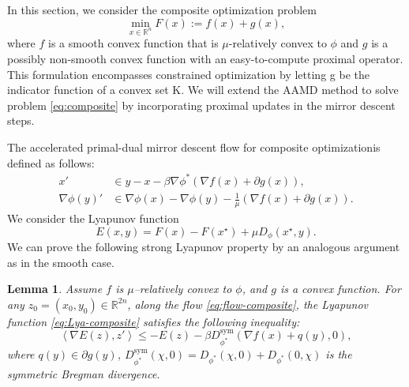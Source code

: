 \documentclass{article}
\newcommand{\LC}[1]{\textcolor{red}{#1}}
\newcommand{\dual}[1]{\left\langle {#1} \right\rangle}
\theoremstyle{plain}
\newtheorem{lemma}[theorem]{Lemma}
\theoremstyle{definition}
\theoremstyle{remark}
\begin{document}
In this section, we consider the composite optimization problem
\begin{equation}\label{eq:composite}
    \min_{x\in\mathbb{R}^n} F(x):=f(x)+g(x),
\end{equation}
where $f$ is a smooth convex function that is $\mu$-relatively convex to $\phi$ and $g$ is a possibly non-smooth convex function with an easy-to-compute proximal operator. This formulation encompasses constrained optimization by letting g be the indicator
function of a convex set K. We will extend the AAMD method to solve problem \eqref{eq:composite} by incorporating proximal updates in the mirror descent steps. 

The accelerated primal-dual mirror descent flow for composite optimizationis defined as follows:
\begin{equation}\label{eq:flow-composite}
\begin{aligned}
    x' &\in y-x-\beta\nabla\phi^*(\nabla f(x)+\partial g(x)), \\
    \nabla \phi(y)' &\in \nabla \phi(x)-\nabla \phi(y)-\frac{1}{\mu}\left(\nabla f(x)+\partial g(x)\right).
\end{aligned}
\end{equation}
We consider the Lyapunov function
\begin{equation}\label{eq:Lya-composite}
    E(x,y)=F(x)-F(x^\star)+\mu D_\phi(x^\star,y).
\end{equation} 
We can prove the following strong Lyapunov property by an analogous argument as in the smooth case.
\begin{lemma}
     Assume $f$ is $\mu$--relatively convex to $\phi$, and $g$ is a convex function. For any $z_0=(x_0,y_0)\in\mathbb{R}^{2n}$, along the flow \eqref{eq:flow-composite}, the Lyapunov function \eqref{eq:Lya-composite} satisfies the following inequality:
    \begin{equation}
        \dual{\nabla E(z),z'}\leq -E(z)-\beta D_{\phi^*}^{\mathrm{sym}}(\nabla f(x)+q(y),0),
    \end{equation}
    where $q(y)\in \partial g(y)$, $D_{\phi^*}^{\mathrm{sym}}(\chi,0)=D_{\phi^*}(\chi,0)+D_{\phi^*}(0,\chi)$ is the symmetric Bregman divergence.
\end{lemma}
\end{document}
